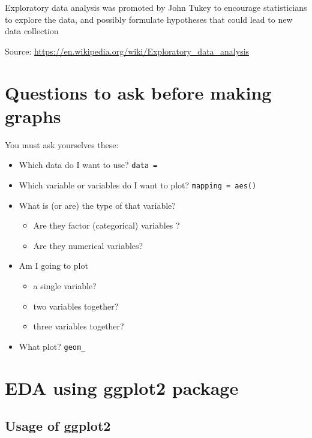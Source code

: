 \documentclass[
  10pt,
]{krantz}
\providecommand{\tightlist}{%
  \setlength{\itemsep}{0pt}\setlength{\parskip}{0pt}}
\begin{document}
Exploratory data analysis was promoted by John Tukey to encourage statisticians to explore the data, and possibly formulate hypotheses that could lead to new data collection

Source: \url{https://en.wikipedia.org/wiki/Exploratory_data_analysis}

\hypertarget{questions-to-ask-before-making-graphs}{%
\section{Questions to ask before making graphs}\label{questions-to-ask-before-making-graphs}}

You must ask yourselves these:

\begin{itemize}
\tightlist
\item
  Which data do I want to use? \texttt{data\ =}
\item
  Which variable or variables do I want to plot? \texttt{mapping\ =\ aes()}
\item
  What is (or are) the type of that variable?

  \begin{itemize}
  \tightlist
  \item
    Are they factor (categorical) variables ?
  \item
    Are they numerical variables?
  \end{itemize}
\item
  Am I going to plot

  \begin{itemize}
  \tightlist
  \item
    a single variable?
  \item
    two variables together?
  \item
    three variables together?
  \end{itemize}
\item
  What plot? \texttt{geom\_}
\end{itemize}

\hypertarget{eda-using-ggplot2-package}{%
\section{\texorpdfstring{EDA using ggplot2 package}{EDA using ggplot2 package}}\label{eda-using-ggplot2-package}}

\hypertarget{usage-of-ggplot2}{%
\subsection{\texorpdfstring{Usage of \textbf{ggplot2}}{Usage of ggplot2}}\label{usage-of-ggplot2}}
\end{document}
